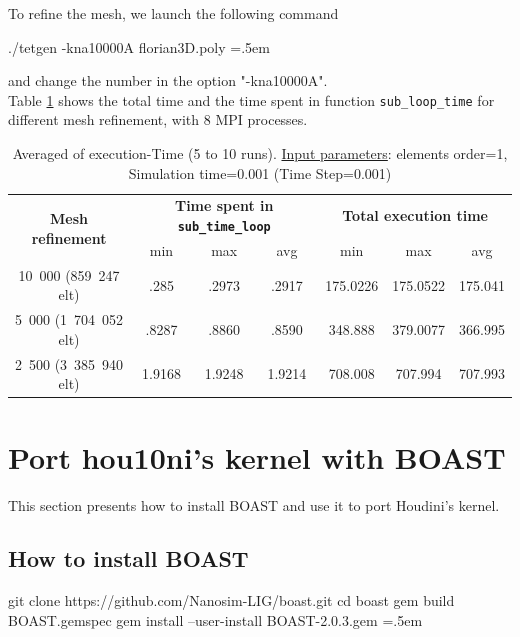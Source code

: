 \documentclass[10pt,twoside]{article}   	%
\newenvironment{cverbatim}
 {\SaveVerbatim{cverb}}
 {\endSaveVerbatim
  \flushleft\fboxrule=0pt\fboxsep=.5em
  \colorbox{cverbbg}{\BUseVerbatim{cverb}}%
  \endflushleft
}
\begin{document}
To refine the mesh, we launch the following command

\begin{cverbatim}
./tetgen -kna10000A florian3D.poly
\end{cverbatim} 

\noindent and change the number in the option "-kna10000A".\\

Table \ref{tab:6} shows the total time and the time spent in function \texttt{sub\_loop\_time} for different mesh refinement, with 8 MPI processes.

\begin{table}[ht!]
\centering
\caption{Averaged of execution-Time (5 to 10 runs). {\underline{Input parameters}}: elements order=1, Simulation time=0.001 (Time Step=0.001)}
{\small
\begin{tabular}{|c|c|c|c|c|c|c|} \hline 
\multirow{2}{*}{ {{\bf{Mesh refinement}}} }	& \multicolumn{3}{c|}{ {{\bf{Time spent in \texttt{sub\_time\_loop}  }}} }	& \multicolumn{3}{c|}{  {{\bf{Total execution time}}} }\\ 
										&   		min & max & avg							& 	min & max & avg			\\ \hline \hline
 		10\ 000 (859\ 247 elt)		           	& .285 & .2973 &  .2917						&  175.0226 & 175.0522 & 175.041	\\ \hline
 		5\ 000 (1\ 704\ 052 elt)		                	& .8287 &  .8860 & .8590						&  348.888 & 379.0077 & 366.995	\\ \hline
 		2\ 500 (3\ 385\ 940 elt)	                		&  1.9168 &  1.9248	& 1.9214					&  708.008 & 707.994 &  707.993 \\ \hline
\end{tabular}
}
\label{tab:6}
\end{table}




\section{Port hou10ni's kernel with BOAST}

This section presents how to install BOAST and use it to port Houdini's kernel. 

\subsection{How to install BOAST}

\begin{cverbatim}
git clone https://github.com/Nanosim-LIG/boast.git
cd boast
gem build BOAST.gemspec
gem install --user-install BOAST-2.0.3.gem 
\end{cverbatim}
\end{document}
